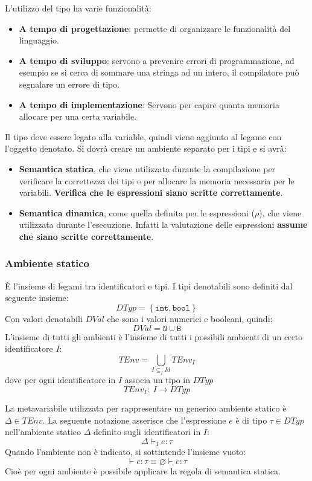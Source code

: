 \documentclass[a4paper]{article}
\begin{document}
L'utilizzo del tipo ha varie funzionalità:
\begin{itemize}
  \item \textbf{A tempo di progettazione}: permette di organizzare le funzionalità
    del linguaggio.

  \item \textbf{A tempo di sviluppo}: servono a prevenire errori di programmazione,
    ad esempio se si cerca di sommare una stringa ad un intero, il compilatore può
    segnalare un errore di tipo.

  \item \textbf{A tempo di implementazione}: Servono per capire quanta memoria
    allocare per una certa variabile.
\end{itemize}

\vspace{1em}
\noindent
Il tipo deve essere legato alla variable, quindi viene aggiunto al legame con l'oggetto
denotato. Si dovrà creare un ambiente separato per i tipi e si avrà:
\begin{itemize}
  \item \textbf{Semantica statica}, che viene utilizzata durante la compilazione per
    verificare la correttezza dei tipi e per allocare la memoria necessaria per
    le variabili. \textbf{Verifica che le espressioni siano scritte correttamente}.

  \item \textbf{Semantica dinamica}, come quella definita per le espressioni
    (\( \rho  \)), che viene utilizzata durante l'esecuzione. Infatti la valutazione
    delle espressioni \textbf{assume che siano scritte correttamente}.
\end{itemize}

\subsubsection{Ambiente statico}
È l'insieme di legami tra identificatori e tipi. I tipi denotabili sono definiti
dal seguente insieme:
\[
  DTyp = \left\{ \texttt{int}, \texttt{bool} \right\}
\] 
Con valori denotabili \( DVal \) che sono i valori numerici e booleani, quindi:
\[
  DVal = \texttt{N} \cup \texttt{B}
\] 
L'insieme di tutti gli ambienti è l'insieme di tutti i possibili ambienti
di un certo identificatore \( I \):
\[
  TEnv = \bigcup_{I \subseteq_f Id} TEnv_I
\] 
dove per ogni identificatore in \( I \) associa un tipo in \( DTyp \) 
\[
  TEnv_I:\; I \to DTyp
\] 

\vspace{1em}
\noindent
La metavariabile utilizzata per rappresentare un generico ambiente statico è
\( \Delta \in TEnv \). La seguente notazione asserisce che l'espressione \( e \) 
è di tipo \( \tau \in DTyp \) nell'ambiente statico \( \Delta \) definito sugli
identificatori in \( I \):
\[
  \Delta \vdash_I e : \tau
\] 
Quando l'ambiente non è indicato, si sottintende l'insieme vuoto:
\[
  \vdash e : \tau \equiv \varnothing \vdash e : \tau
\] 
Cioè per ogni ambiente è possibile applicare la regola di semantica statica.
\end{document}

